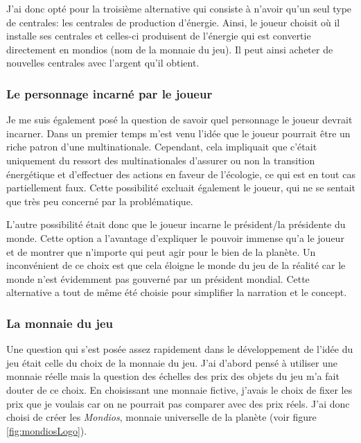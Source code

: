 \documentclass{article}
\begin{document}
        
        J'ai donc opté pour la troisième alternative qui consiste à n'avoir qu'un seul type de centrales: les centrales de production d'énergie. Ainsi, le joueur choisit où il installe ses centrales et celles-ci produisent de l'énergie qui est convertie directement en mondios (nom de la monnaie du jeu). Il peut ainsi acheter de nouvelles centrales avec l'argent qu'il obtient.
        
        \subsubsection{Le personnage incarné par le joueur}
        Je me suis également posé la question de savoir quel personnage le joueur devrait incarner. Dans un premier temps m'est venu l'idée que le joueur pourrait être un riche patron d'une multinationale. Cependant, cela impliquait que c'était uniquement du ressort des multinationales d'assurer ou non la transition énergétique et d'effectuer des actions en faveur de l'écologie, ce qui est en tout cas partiellement faux. Cette possibilité excluait également le joueur, qui ne se sentait que très peu concerné par la problématique.
        
        
        L'autre possibilité était donc que le joueur incarne le président/la présidente du monde. Cette option a l'avantage d'expliquer le pouvoir immense qu'a le joueur et de montrer que n'importe qui peut agir pour le bien de la planète.
        Un inconvénient de ce choix est que cela éloigne le monde du jeu de la réalité car le monde n'est évidemment pas gouverné par un président mondial. Cette alternative a tout de même été choisie pour simplifier la narration et le concept.
        

		\subsubsection{La monnaie du jeu}
		Une question qui s'est posée assez rapidement dans le développement de l'idée du jeu était celle du choix de la monnaie du jeu. J'ai d'abord pensé à utiliser une monnaie réelle mais la question des échelles des prix des objets du jeu m'a fait douter de ce choix. En choisissant une monnaie fictive, j'avais le choix de fixer les prix que je voulais car on ne pourrait pas comparer avec des prix réels.
		J'ai donc choisi de créer les \textit{Mondios}, monnaie universelle de la planète (voir figure \ref{fig:mondiosLogo}).
		
\end{document}
